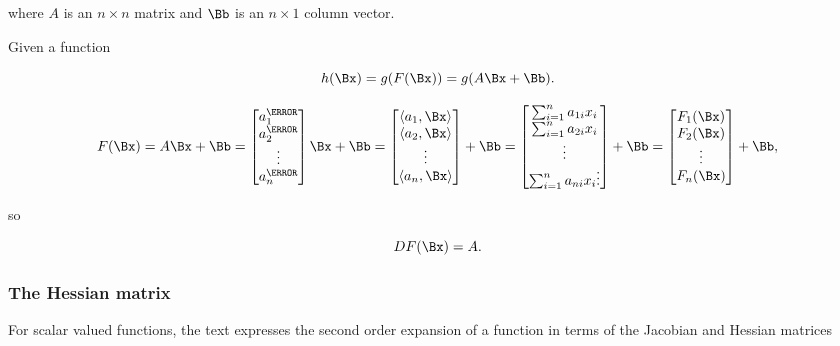 where \( A \) is an \( n \times n \) matrix and \( \Bb \) is an \( n \times 1 \) column vector.

Given a function

\begin{equation}\label{eqn:convex-optimizationLecture2:784}
h(\Bx) = g(F(\Bx)) = g(A \Bx + \Bb).
\end{equation}

\begin{dmath}\label{eqn:convex-optimizationLecture2:804}
F(\Bx)
= A \Bx + \Bb
=
\begin{bmatrix}
a_1^\T \\
a_2^\T \\
\vdots \\
a_n^\T \\
\end{bmatrix}
\Bx
+
\Bb
=
\begin{bmatrix}
\innerproduct{a_1}{\Bx} \\
\innerproduct{a_2}{\Bx} \\
\vdots \\
\innerproduct{a_n}{\Bx}
\end{bmatrix}
+
\Bb
=
\begin{bmatrix}
\sum_{i = 1}^n a_{1i} x_i \\
\sum_{i = 1}^n a_{2i} x_i \\
\vdots \\
\sum_{i = 1}^n a_{ni} x_i
\vdots \\
\end{bmatrix}
+
\Bb
=
\begin{bmatrix}
F_1(\Bx) \\
F_2(\Bx) \\
\vdots \\
F_n(\Bx) \\
\end{bmatrix}
+
\Bb,
\end{dmath}

so

\begin{dmath}\label{eqn:convex-optimizationLecture2:824}
D F(\Bx) = A.
\end{dmath}

\subsubsection{The Hessian matrix}

For scalar valued functions, the text expresses the second order expansion of a function in terms of the Jacobian and Hessian matrices

